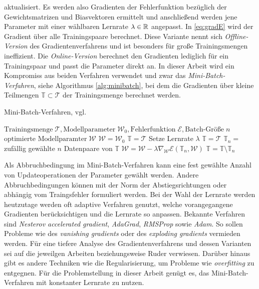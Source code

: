 aktualisiert. Es werden also Gradienten der Fehlerfunktion bezüglich der Gewichtsmatrizen und Biasvektoren ermittelt und anschließend werden jene Parameter mit einer wählbaren Lernrate $\lambda \in \mathbb{R}$ angepasst. In \ref{eq:gradE} wird der Gradient über alle Trainingspaare berechnet. Diese Variante nennt sich \textit{Offline-Version} des Gradientenverfahrens und ist besonders für große Trainingsmengen ineffizient. Die \textit{Online-Version} berechnet den Gradienten lediglich für ein Trainingspaar und passt die Parameter direkt an. In dieser Arbeit wird ein Kompromiss aus beiden Verfahren verwendet und zwar das \textit{Mini-Batch-Verfahren}, siehe Algorithmus \ref{alg:minibatch}, bei dem die Gradienten über kleine Teilmengen $\mathbb{T} \subset \mathcal{T}$ der Trainingsmenge berechnet werden.

\begin{algorithm}
    \caption{Mini-Batch-Verfahren, vgl. \cite{gruening}}\label{alg:minibatch}
    \begin{algorithmic}
    \Require $ \text{Trainingsmenge} \; \mathcal{T}, \text{Modellparameter} \; \mathcal{W}_0, \text{Fehlerfunktion} \; \mathcal{E}, \text{Batch-Größe} \; n$
    \Ensure $\text{optimierte Modellparamter} \; \mathcal{W}$
    \State $\mathcal{W}=\mathcal{W}_0$
    \State $\mathbb{T}=\mathcal{T}$
    \State Setze Lernrate $\lambda$      
     
        \State $\mathbb{T}=\mathcal{T}$
    \EndIf
    \State $\mathbb{T}_n=$ zufällig gewählte $n$ Datenpaare von $\mathbb{T}$ 
    \State $\mathcal{W}=\mathcal{W}-\lambda \nabla_{\mathcal{W}} \mathcal{E}(\mathbb{T}_n,\mathcal{W})$
    \State $\mathbb{T}= \mathbb{T} \setminus \mathbb{T}_n$
    \EndWhile
    \end{algorithmic}
\end{algorithm}

Als Abbruchbedingung im Mini-Batch-Verfahren kann eine fest gewählte Anzahl von Updateoperationen der Parameter gewählt werden. Andere Abbruchbedingungen können mit der Norm der Abstiegsrichtungen\cite{bishop2006pattern} oder abhängig vom Traingsfehler formuliert werden. Bei der Wahl der Lernrate werden heutzutage werden oft adaptive Verfahren genutzt, welche vorangegangene Gradienten berücksichtigen und die Lernrate so anpassen. Bekannte Verfahren sind \textit{Nesterov accelerated
gradient}\cite{sutskever2013importance}, \textit{AdaGrad}\cite{duchi2011adaptive}, \textit{RMSProp}\cite{tieleman2012lecture} sowie \textit{Adam}\cite{Kingma2015AdamAM}. So sollen Probleme wie des \textit{vanishing gradients} oder des \textit{exploding gradients} vermieden werden\cite{hanin2018neural}.
Für eine tiefere Analyse des Gradientenverfahrens und dessen Varianten sei auf die jeweilgen Arbeiten beziehungsweise Ruder\cite{ruder2016overview} verwiesen. Darüber hinaus gibt es andere Techniken wie die Regularisierung, um Probleme wie \textit{overfitting} zu entgegnen.
Für die Problemstellung in dieser Arbeit genügt es, das Mini-Batch-Verfahren mit konstanter Lernrate zu nutzen. 

